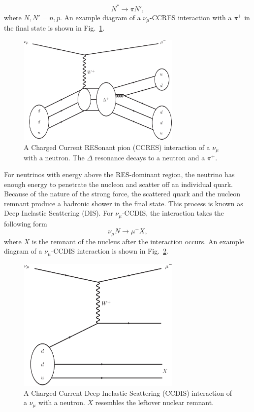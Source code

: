 \begin{equation}
N^{*} \rightarrow \pi N',
\end{equation}
where $N, N' = n, p$.  An example diagram of a $\nu_\mu$-CCRES interaction with a $\pi^+$ in the final state is shown in Fig.~\ref{fig:CCRESFD}.
\begin{figure}%
  \centering
  \includegraphics[width=8cm]{images/neutrino_interactions/CCRES_FD.eps}
  \caption{A Charged Current RESonant pion (CCRES) interaction of a $\nu_\mu$ with a neutron.  The $\Delta$ resonance decays to a neutron and a $\pi^+$.}
  \label{fig:CCRESFD}
\end{figure}
\newline
\newline
For neutrinos with energy above the RES-dominant region, the neutrino has enough energy to penetrate the nucleon and scatter off an individual quark.  Because of the nature of the strong force, the scattered quark and the nucleon remnant produce a hadronic shower in the final state.  This process is known as Deep Inelastic Scattering (DIS).  For $\nu_\mu$-CCDIS, the interaction takes the following form
\begin{equation}
\nu_\mu N \rightarrow \mu^- X,
\label{eq:CCDIS}
\end{equation}
where $X$ is the remnant of the nucleus after the interaction occurs.  An example diagram of a $\nu_\mu$-CCDIS interaction is shown in Fig.~\ref{fig:CCDISFG}.
\begin{figure}%
  \centering
  \includegraphics[width=8cm]{images/neutrino_interactions/CCDIS_FD.eps}
  \caption{A Charged Current Deep Inelastic Scattering (CCDIS) interaction of a $\nu_\mu$ with a neutron. $X$ resembles the leftover nuclear remnant.}
  \label{fig:CCDISFG}
\end{figure}
